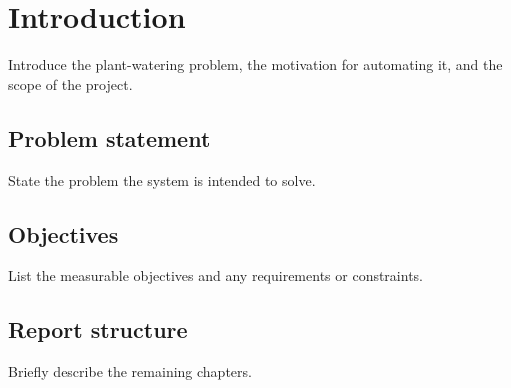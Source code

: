 \chapter{Introduction}
\label{chap:introduction}

Introduce the plant-watering problem, the motivation for automating it, and the
scope of the project.

\section{Problem statement}

State the problem the system is intended to solve.

\section{Objectives}

List the measurable objectives and any requirements or constraints.

\section{Report structure}

Briefly describe the remaining chapters.
